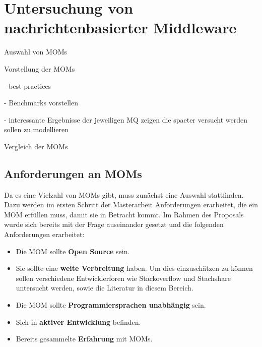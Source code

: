 

\chapter{Untersuchung von nachrichtenbasierter Middleware}
\label{sec:mom}
Auswahl von MOMs

Vorstellung der MOMs

- best practices

- Benchmarks vorstellen

- interessante Ergebnisse der jeweiligen MQ zeigen die spaeter versucht werden sollen zu modellieren

Vergleich der MOMs

\label{ch:momsysteme}
\section{Anforderungen an MOMs}
Da es eine Vielzahl von MOMs gibt, muss zunächst eine Auswahl stattfinden. Dazu werden im ersten Schritt der Masterarbeit Anforderungen erarbeitet, die ein MOM erfüllen muss, damit sie in Betracht kommt. Im Rahmen des Proposals wurde sich bereits mit der Frage auseinander gesetzt und die folgenden Anforderungen erarbeitet:
\begin{itemize}
\item Die MOM sollte \textbf{Open Source} sein.
\item Sie sollte eine \textbf{weite Verbreitung} haben. Um dies einzuschätzen zu können sollen verschiedene Entwicklerforen wie Stackoverflow und Stachshare untersucht werden, sowie die Literatur in diesem Bereich.
\item %
Die MOM sollte \textbf{Programmiersprachen unabhängig} sein.
\item Sich in \textbf{aktiver Entwicklung} befinden.
\item Bereits gesammelte \textbf{Erfahrung} mit MOMs.
\end{itemize}

